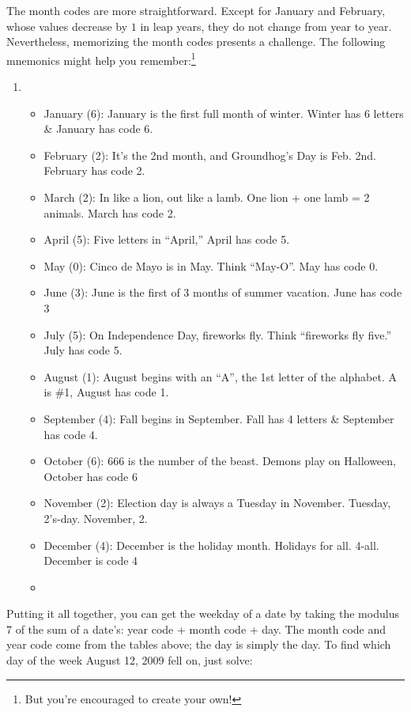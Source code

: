 \documentclass{article}
\begin{document}
  The month codes are more straightforward. 
  Except for January and February, whose values decrease by $1$ in leap years, 
  they do not change from year to year. 
  Nevertheless, memorizing the month codes presents a challenge. 
  The following mnemonics might help you remember:\footnote{But you're encouraged to create
  your own!}
  \begin{enumerate} \item[] \begin{itemize}
    \item January (6): January is the first full month of winter. 
          Winter has 6 letters \& January has code 6. 
    \item February (2): It's the 2nd month, and Groundhog's Day is Feb. 2nd. 
          February has code 2.
    \item March (2): In like a lion, out like a lamb. 
          One lion + one lamb = 2 animals. March has code 2. 
    \item April (5): Five letters in “April,” April has code 5.
    \item May (0): Cinco de Mayo is in May. Think “May-O”. May has code 0.
    \item June (3): June is the first of 3 months of summer vacation. June has code 3
    \item July (5): On Independence Day, fireworks fly. Think “fireworks fly five.” 
          July has code 5. 
    \item August (1): August begins with an “A”, the 1st letter of the alphabet. 
          A is \#1, August has code 1. 
    \item September (4): Fall begins in September. Fall has 4 letters \& September has code 4.
    \item October (6): 666 is the number of the beast. 
          Demons play on Halloween, October has code 6 
    \item November (2): Election day is always a Tuesday in November. Tuesday, 2's-day. 
          November, 2. 
    \item December (4): December is the holiday month. 
          Holidays for all. 4-all. December is code 4
    \item[]
  \end{itemize} \end{enumerate}

  Putting it all together, you can get the weekday of a date by taking the modulus 7 of 
  the sum of a date's: year code + month code + day. 
  The month code and year code come from the tables above; the day is simply the day. 
  To find which day of the week August 12, 2009 fell on, just solve:
  
\end{document}
